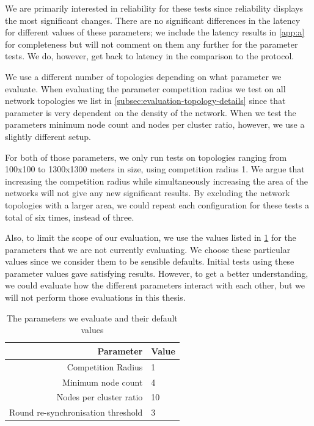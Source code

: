 We are primarily interested in reliability for these tests since reliability displays the most significant changes. There are no significant differences in the latency for different values of these parameters; we include the latency results in \cref{app:a} for completeness but will not comment on them any further for the parameter tests. We do, however, get back to latency in the comparison to the \atwo{} protocol.

We use a different number of topologies depending on what parameter we evaluate.  When evaluating the parameter competition radius we test on all network topologies we list in \cref{subsec:evaluation-topology-details} since that parameter is very dependent on the density of the network. When we test the parameters minimum node count and nodes per cluster ratio, however, we use a slightly different setup.

For both of those parameters, we only run tests on topologies ranging from 100x100 to 1300x1300 meters in size, using competition radius 1. We argue that increasing the competition radius while simultaneously increasing the area of the networks will not give any new significant results. By excluding the network topologies with a larger area, we could repeat each configuration for these tests a total of six times, instead of three.

Also, to limit the scope of our evaluation, we use the values listed in \cref{tab:parameter-default-values} for the parameters that we are not currently evaluating. We choose these particular values since we consider them to be sensible defaults. Initial tests using these parameter values gave satisfying results. However, to get a better understanding, we could evaluate how the different parameters interact with each other, but we will not perform those evaluations in this thesis.

\begin{table}[bt]
\centering
\caption{The parameters we evaluate and their default values}
\label{tab:parameter-default-values}
\begin{tabular}{r|l}
\textbf{Parameter}                 & \textbf{Value} \\ \hline
Competition Radius                 & 1              \\
Minimum node count                 & 4              \\
Nodes per cluster ratio            & 10             \\
Round re-synchronisation threshold & 3             
\end{tabular}
\end{table}


